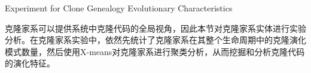 
{Experiment for Clone Genealogy Evolutionary Characteristics}

克隆家系可以提供系统中克隆代码的全局视角，因此本节对克隆家系实体进行实验分析。在克隆家系实验中，依然先统计了克隆家系在其整个生命周期中的克隆演化模式数量，然后使用X-means对克隆家系进行聚类分析，从而挖掘和分析克隆代码的演化特征。

